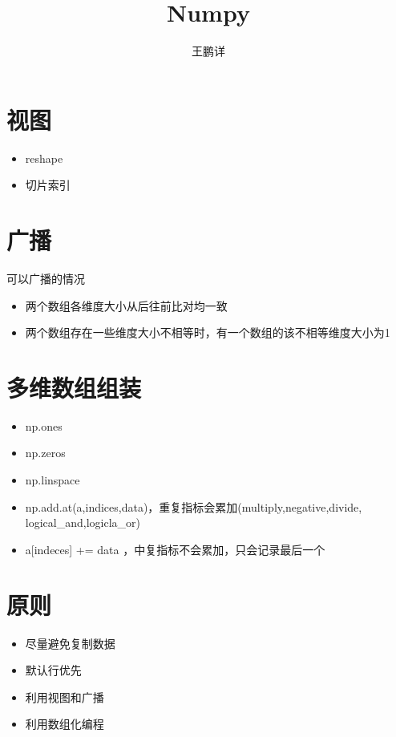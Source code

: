 \documentclass[12pt,a4paper]{article}
\title{Numpy}
\author{王鹏详}
\date{\chntoday}
\begin{document}
	\maketitle
	\newpage
	\section{视图}
	\begin{itemize}
		\item reshape
		\item 切片索引
	\end{itemize}
	\section{广播}
	可以广播的情况
	\begin{itemize}
		\item  两个数组各维度大小从后往前比对均一致
		\item  两个数组存在一些维度大小不相等时，有一个数组的该不相等维度大小为1
	\end{itemize}
	\section{多维数组组装}
	\begin{itemize}
		\item np.ones
		\item np.zeros
		\item np.linspace
		\item np.add.at(a,indices,data)，重复指标会累加(multiply,negative,divide,
				logical\_and,logicla\_or)
		\item a[indeces] += data ，中复指标不会累加，只会记录最后一个
	\end{itemize}
	\section{原则}
	\begin{itemize}
		\item 尽量避免复制数据
		\item 默认行优先
		\item 利用视图和广播
		\item 利用数组化编程
	\end{itemize}
\end{document}
